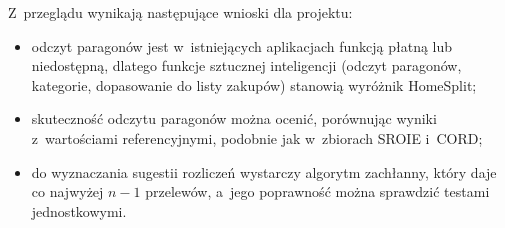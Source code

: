 Z~przeglądu wynikają następujące wnioski dla projektu:

\begin{itemize}
  \item odczyt paragonów jest w~istniejących aplikacjach funkcją płatną lub niedostępną, dlatego funkcje sztucznej inteligencji (odczyt paragonów, kategorie, dopasowanie do listy zakupów) stanowią wyróżnik HomeSplit;
  \item skuteczność odczytu paragonów można ocenić, porównując wyniki z~wartościami referencyjnymi, podobnie jak w~zbiorach SROIE i~CORD;
  \item do wyznaczania sugestii rozliczeń wystarczy algorytm zachłanny, który daje co najwyżej $n-1$ przelewów, a~jego poprawność można sprawdzić testami jednostkowymi.
\end{itemize}
